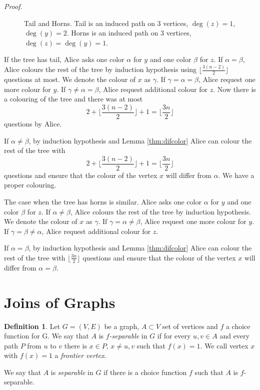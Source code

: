 \documentclass[11pt,a4paper]{article}
\theoremstyle{plain}
\newenvironment{pf}{
  \par\medskip\noindent
  \textit{Proof}.
}{
\newline
\rightline{$\square$}  %
}
\theoremstyle{definition}
\newtheorem{defn}{Definition}[section]
\theoremstyle{remark}
\begin{document}
\begin{pf}
\begin{figure}[h]
\caption{Tail and Horns. Tail is an induced path on 3 vertices, $\deg(z)=1$, $\deg(y)=2$. Horns is an induced path on 3 vertices, $\deg(z)=\deg(y)=1$.}
\label{fig:hornstail}
\end{figure}

If the tree has tail, Alice asks one color $\alpha$ for $y$ and one color $\beta$ for $z$. If $\alpha = \beta$, Alice colours the rest of the tree by induction hypothesis using $\lfloor {\frac{3(n-2)}{2}} \rfloor$ questions at most. We denote the colour of $x$ as $\gamma$. If $\gamma = \alpha = \beta$, Alice request one more colour for $y$. If $\gamma \neq \alpha = \beta$, Alice request additional colour for $z$. Now there is a colouring of the tree and there was at most $$2+\lfloor {\frac{3(n-2)}{2}} \rfloor+1=\lfloor {\frac{3n}{2}} \rfloor$$ questions by Alice.

If $\alpha \neq \beta$, by induction hypothesis and Lemma \ref{thm:difcolor} Alice can colour the rest of the tree with
$$2+\lfloor {\frac{3(n-2)}{2}} \rfloor+1=\lfloor {\frac{3n}{2}} \rfloor$$
questions and ensure that the colour of the vertex $x$ will differ from $\alpha$. We have a proper colouring.

The case when the tree has horns is similar. Alice asks one color $\alpha$ for $y$ and one color $\beta$ for $z$. If $\alpha \neq \beta$, Alice colours the rest of the tree by induction hypothesis. We denote the colour of $x$ as $\gamma$. If $\gamma = \alpha \neq \beta$, Alice request one more colour for $y$. If $\gamma = \beta \neq \alpha$, Alice request additional colour for $z$.

If $\alpha = \beta$, by induction hypothesis and Lemma \ref{thm:difcolor} Alice can colour the rest of the tree with $\lfloor {\frac{3n}{2}} \rfloor$ questions and ensure that the colour of the vertex $x$ will differ from $\alpha = \beta$.\end{pf}

\section{Joins of Graphs}


\begin{defn}
Let $G=(V,E)$ be a graph, $A\subset V$ set of vertices and $f$ a choice function for G. We say that $A$ is \emph{$f$-separable} in $G$ if for every $u,v\in A$ and every path $P$ from $u$ to $v$ there is $x\in P,\, x\neq u,v$ such that $f(x)=1$. We call vertex $x$ with $f(x)=1$ a \emph{frontier vertex}. 

We say that $A$ is \emph{separable} in $G$ if there is a choice function $f$ such that $A$ is $f$-separable.
\end{defn}
\end{document}
